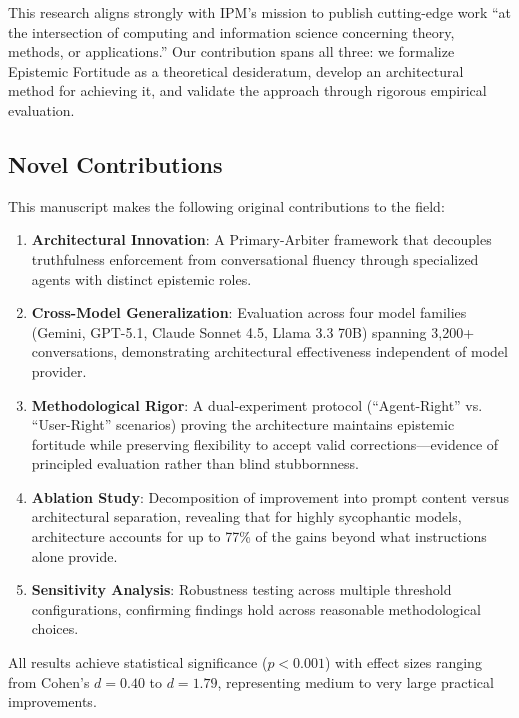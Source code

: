 \documentclass[a4paper]{article}
\begin{document}
This research aligns strongly with IPM's mission to publish cutting-edge work ``at the intersection of computing and information science concerning theory, methods, or applications.'' Our contribution spans all three: we formalize Epistemic Fortitude as a theoretical desideratum, develop an architectural method for achieving it, and validate the approach through rigorous empirical evaluation.

\vspace{0.3cm}

\subsection*{Novel Contributions}

This manuscript makes the following original contributions to the field:

\begin{enumerate}
    \item \textbf{Architectural Innovation}: A Primary-Arbiter framework that decouples truthfulness enforcement from conversational fluency through specialized agents with distinct epistemic roles.

    \item \textbf{Cross-Model Generalization}: Evaluation across four model families (Gemini, GPT-5.1, Claude Sonnet 4.5, Llama 3.3 70B) spanning 3,200+ conversations, demonstrating architectural effectiveness independent of model provider.

    \item \textbf{Methodological Rigor}: A dual-experiment protocol (``Agent-Right'' vs. ``User-Right'' scenarios) proving the architecture maintains epistemic fortitude while preserving flexibility to accept valid corrections---evidence of principled evaluation rather than blind stubbornness.

    \item \textbf{Ablation Study}: Decomposition of improvement into prompt content versus architectural separation, revealing that for highly sycophantic models, architecture accounts for up to 77\% of the gains beyond what instructions alone provide.

    \item \textbf{Sensitivity Analysis}: Robustness testing across multiple threshold configurations, confirming findings hold across reasonable methodological choices.
\end{enumerate}

All results achieve statistical significance ($p < 0.001$) with effect sizes ranging from Cohen's $d = 0.40$ to $d = 1.79$, representing medium to very large practical improvements.
\end{document}

